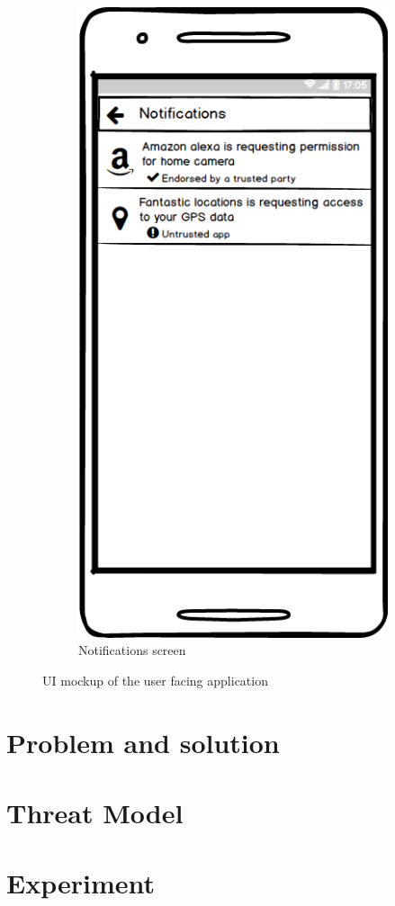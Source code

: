 \documentclass[conference]{IEEEtran}
\begin{document}
\begin{figure}[t]
\begin{subfigure}{0.24\textwidth}
	\includegraphics[width=0.95\linewidth]{screen4.png}
	\caption{Notifications screen}
	\label{fig:screen4}
	\end{subfigure}
\caption{UI mockup of the user facing application}\label{fig:screens}
\end{figure}

\section{Problem and solution}


\section{Threat Model}


\section{Experiment}


\begin{thebibliography}{00}

\end{thebibliography}
\end{document}
